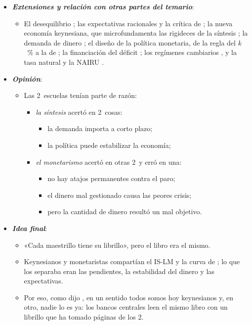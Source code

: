\documentclass[11pt]{article}
\begin{document}
\begin{itemize}
\begin{itemize}
  \item Lo que sobrevivió es el suelo de los bancos centrales de hoy.
  \end{itemize}
\item \textbf{\emph{Extensiones y relación con otras partes del temario}}:
  \begin{itemize}
  \item El desequilibrio ; las expectativas racionales y la crítica de  ; la nueva economía keynesiana, que microfundamenta las rigideces de la síntesis ; la demanda de dinero ; el diseño de la política monetaria, de la regla del $k$~\% a la de  ; la financiación del déficit ; los regímenes cambiarios , y la tasa natural y la NAIRU .
  \end{itemize}
\item \textbf{\emph{Opinión}}:
  \begin{itemize}
  \item Las 2~escuelas tenían parte de razón:
    \begin{itemize}
    \item \emph{la síntesis} acertó en 2~cosas:
      \begin{itemize}
      \item la demanda importa a corto plazo;
      \item la política puede estabilizar la economía;
      \end{itemize}
    \item \emph{el monetarismo} acertó en otras 2~y erró en una:
      \begin{itemize}
      \item no hay atajos permanentes contra el paro;
      \item el dinero mal gestionado causa las peores crisis;
      \item pero la cantidad de dinero resultó un mal objetivo.
      \end{itemize}
    \end{itemize}
  \end{itemize}
\item \textbf{\emph{Idea final}}:
  \begin{itemize}
  \item «Cada maestrillo tiene su librillo», pero el libro era el mismo.

  \item Keynesianos y monetaristas compartían el IS-LM y la curva de ; lo que los separaba eran las pendientes, la estabilidad del dinero y las expectativas.

  \item Por eso, como dijo , en un sentido todos somos hoy keynesianos y, en otro, nadie lo es ya: los bancos centrales leen el mismo libro con un librillo que ha tomado páginas de los 2.
  \end{itemize}
\end{itemize}
\end{document}
